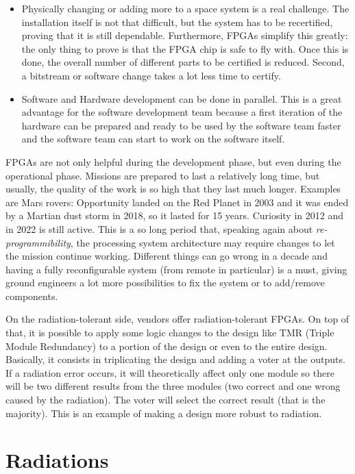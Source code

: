 \begin{itemize}
    \item Physically changing or adding more to a space system is a real challenge. The installation itself is not that difficult, but the system has to be recertified, proving that it is still dependable. Furthermore, FPGAs simplify this greatly: the only thing to prove is that the FPGA chip is safe to fly with. Once this is done, the overall number of different parts to be certified is reduced. Second, a bitstream or software change takes a lot less time to certify.
    \item Software and Hardware development can be done in parallel. This is a great advantage for the software development team because a first iteration of the hardware can be prepared and ready to be used by the software team faster and the software team can start to work on the software itself.
\end{itemize}

FPGAs are not only helpful during the development phase, but even during the operational phase. Missions are prepared to last a relatively long time, but usually, the quality of the work is so high that they last much longer. Examples are Mars rovers: Opportunity landed on the Red Planet in 2003 and it was ended by a Martian dust storm in 2018, so it lasted for 15 years. Curiosity in 2012 and in 2022 is still active. This is a so long period that, speaking again about \textit{re-programmibility}, the processing system architecture may require changes to let the mission continue working. Different things can go wrong in a decade and having a fully reconfigurable system (from remote in particular) is a must, giving ground engineers a lot more possibilities to fix the system or to add/remove components. \bigskip

On the radiation-tolerant side, vendors offer radiation-tolerant FPGAs. On top of that, it is possible to apply some logic changes to the design like TMR (Triple Module Redundancy) to a portion of the design or even to the entire design. Basically, it consists in triplicating the design and adding a voter at the outputs. If a radiation error occurs, it will theoretically affect only one module so there will be two different results from the three modules (two correct and one wrong caused by the radiation). The voter will select the correct result (that is the majority). This is an example of making a design more robust to radiation.\bigskip

\section{Radiations}

